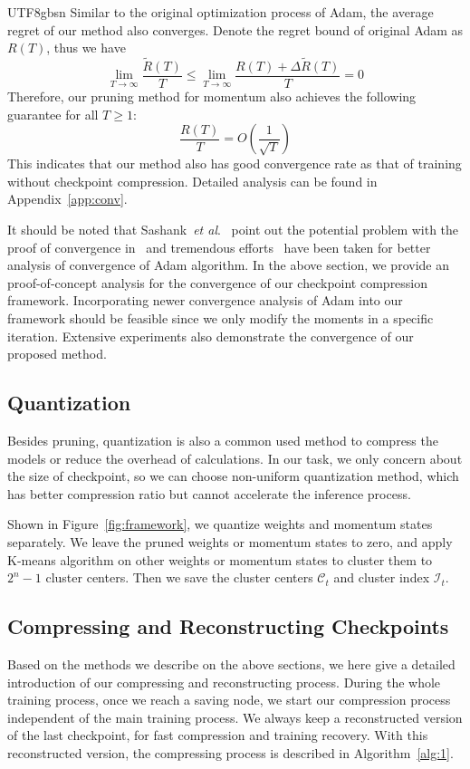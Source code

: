 \documentclass{article}
\theoremstyle{plain}
\theoremstyle{definition}
\theoremstyle{remark}
\newcommand{\etal}{\textit{et al}.}
\begin{document}
\begin{CJK}{UTF8}{gbsn}
Similar to the original optimization process of Adam, the average regret of our method also converges. Denote the regret bound of original Adam as $R(T)$, thus we have
\begin{equation}
	\lim _{T \rightarrow \infty} \frac{\tilde R(T)}{T} \le \lim _{T \rightarrow \infty} \frac{ R(T)+\Delta\tilde R(T)}{T}=0
\end{equation}
Therefore, our pruning method for momentum also achieves the following guarantee for all $T\ge1$:
\begin{equation}
	\frac{R(T)}{T}=O\left(\frac{1}{\sqrt{T}}\right)
\end{equation}
This indicates that our method also has good convergence rate as that of training without checkpoint compression. Detailed analysis can be found in Appendix~\ref{app:conv}.

It should be noted that Sashank~\etal~\cite{sashank2018convergence} point out the potential problem with the proof of convergence in~\cite{kingma2014adam} and tremendous efforts~\cite{shi2021rmsprop,zhang2022adam,defossez2020simple} have been taken for better analysis of convergence of Adam algorithm. In the above section, we provide an proof-of-concept analysis for the convergence of our checkpoint compression framework. Incorporating newer convergence analysis of Adam into our framework should be feasible since we only modify the moments in a specific iteration. Extensive experiments also demonstrate the convergence of our proposed method.


\subsection{Quantization}
\label{ssec:quant}
Besides pruning, quantization is also a common used method to compress the models or reduce the overhead of calculations. In our task, we only concern about the size of checkpoint, so we can choose non-uniform quantization method, which has better compression ratio but cannot accelerate the inference process.

Shown in Figure~\ref{fig:framework}, we quantize weights and momentum states separately. We leave the pruned weights or momentum states to zero, and apply K-means algorithm on other weights or momentum states to cluster them to $2^n-1$ cluster centers. Then we save the cluster centers $\mathcal{C}_t$ and cluster index $\mathcal{I}_t$.

\subsection{Compressing and Reconstructing Checkpoints}
\label{ssec:comp-recon}
Based on the methods we describe on the above sections, we here give a detailed introduction of our compressing and reconstructing process. During the whole training process, once we reach a saving node, we start our compression process independent of the main training process. We always keep a reconstructed version of the last checkpoint, for fast compression and training recovery. With this reconstructed version, the compressing process is described in Algorithm~\ref{alg:1}. 


\end{CJK}
\end{document}
